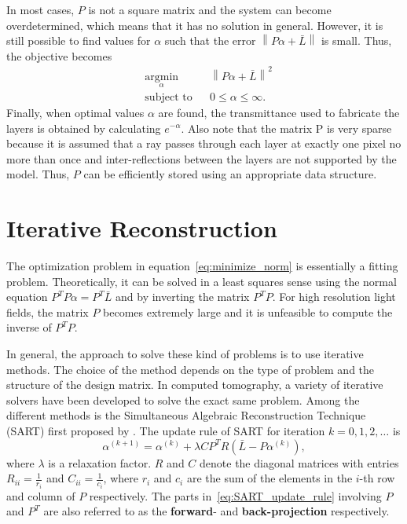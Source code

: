 In most cases, $P$ is not a square matrix and the system can become overdetermined, which means that it has no solution in general.
However, it is still possible to find values for $\alpha$ such that the error $\left\lVert P \alpha + \bar{L} \right\rVert$ is small. 
Thus, the objective becomes
\begin{equation} \label{eq:minimize_norm}
	\begin{aligned}
		& \underset{\alpha}{\text{argmin}} 	& & \left\lVert P \alpha + \bar{L} \right\rVert ^2 \\
		& \text{subject to} 				& & 0 \leq \alpha \leq \infty.
	\end{aligned}
\end{equation}
Finally, when optimal values $\alpha$ are found, the transmittance used to fabricate the layers is obtained by calculating $e^{-\alpha}$.
Also note that the matrix P is very sparse because it is assumed that a ray passes through each layer at exactly one pixel no more than once and inter-reflections between the layers are not supported by the model.
Thus, $P$ can be efficiently stored using an appropriate data structure.

\section{Iterative Reconstruction}


The optimization problem in equation~\ref{eq:minimize_norm} is essentially a fitting problem.
Theoretically, it can be solved in a least squares sense using the normal equation $P^T P \alpha = P^T \bar{L}$ and by inverting the matrix $P^T P$.
For high resolution light fields, the matrix $P$ becomes extremely large and it is unfeasible to compute the inverse of $P^T P$.

In general, the approach to solve these kind of problems is to use iterative methods.
The choice of the method depends on the type of problem and the structure of the design matrix.
In computed tomography, a variety of iterative solvers have been developed to solve the exact same problem. 
Among the different methods is the Simultaneous Algebraic Reconstruction Technique (\mbox{SART}) first proposed by \cite{SART}.
The update rule of \mbox{SART} for iteration $k = 0, 1, 2, \dots$ is
\begin{equation}\label{eq:SART_update_rule}
	\alpha^{(k + 1)} = \alpha^{(k)} + \lambda C P^T R \left( \bar{L} - P \alpha^{(k)} \right), 	
\end{equation}
where $\lambda$ is a relaxation factor.
$R$ and $C$ denote the diagonal matrices with entries $R_{ii} = \frac{1}{r_i}$ and $C_{ii} = \frac{1}{c_i}$, where $r_i$ and $c_i$ are the sum of the elements in the \mbox{$i$-th} row and column of $P$ respectively.
The parts in~\ref{eq:SART_update_rule} involving $P$ and $P^T$ are also referred to as the \textbf{forward}- and \textbf{back-projection} respectively.

